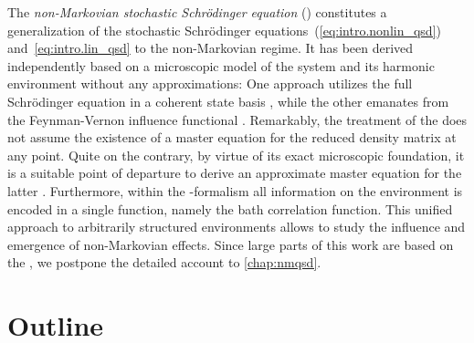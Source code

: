 
The \emph{non-Markovian stochastic Schrödinger equation} (\NMSSE) constitutes a generalization of the stochastic Schrödinger equations~(\ref{eq:intro.nonlin_qsd}) and~\ref{eq:intro.lin_qsd} to the non-Markovian regime.
It has been derived independently based on a microscopic model of the system and its harmonic environment without any approximations:
One approach utilizes the full Schrödinger equation in a coherent state basis \cite{Di96_wave_eq}, while the other emanates from the Feynman-Vernon influence functional \cite{St96_lin_nmqsd}.
Remarkably, the treatment of the \NMSSE does not assume the existence of a master equation for the reduced density matrix at any point.
Quite on the contrary, by virtue of its exact microscopic foundation, it is a suitable point of departure to derive an approximate master equation for the latter \cite{YuDiGi00_master}.
Furthermore, within the \NMSSE-formalism all information on the environment is encoded in a single function, namely the bath correlation function.
This unified approach to arbitrarily structured environments allows to study the influence and emergence of non-Markovian effects.
Since large parts of this work are based on the \NMSSE, we postpone the detailed account to \autoref{chap:nmqsd}.



\section{Outline}
\label{sec:into.outline}

